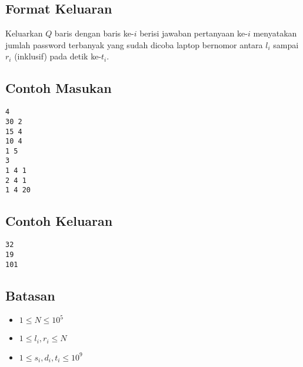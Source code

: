 \documentclass{article}
\begin{document}
\subsection*{Format Keluaran}

\par\noindent Keluarkan $Q$ baris dengan baris ke-$i$ berisi jawaban pertanyaan ke-$i$ menyatakan jumlah password terbanyak yang sudah dicoba laptop bernomor antara $l_i$ sampai $r_i$ (inklusif) pada detik ke-$t_i$.

\subsection*{Contoh Masukan}

\begin{lstlisting}
4
30 2
15 4
10 4
1 5
3
1 4 1
2 4 1
1 4 20
\end{lstlisting}

\subsection*{Contoh Keluaran}

\begin{lstlisting}
32
19
101
\end{lstlisting}

\subsection*{Batasan}

\begin{itemize}
  \item $1 \leq N \leq 10^5$
  \item $1 \leq l_i, r_i \leq N$
  \item $1 \leq s_i, d_i, t_i \leq 10^9$
\end{itemize}
\end{document}
